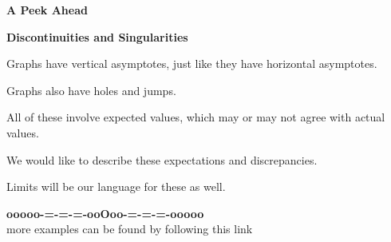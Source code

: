\documentclass{ximera}
\begin{document}
\textbf{\textcolor{red!70!black}{A Peek Ahead}}


\textbf{Discontinuities and Singularities}


Graphs have vertical asymptotes, just like they have horizontal asymptotes.

Graphs also have holes and jumps.


All of these involve expected values, which may or may not agree with actual values.


We would like to describe these expectations and discrepancies.


Limits will be our language for these as well.

















































\begin{onlineOnly}
\begin{center}
\textbf{\textcolor{green!50!black}{ooooo-=-=-=-ooOoo-=-=-=-ooooo}} \\

more examples can be found by following this link\\ 

\end{center}
\end{onlineOnly}
\end{document}
